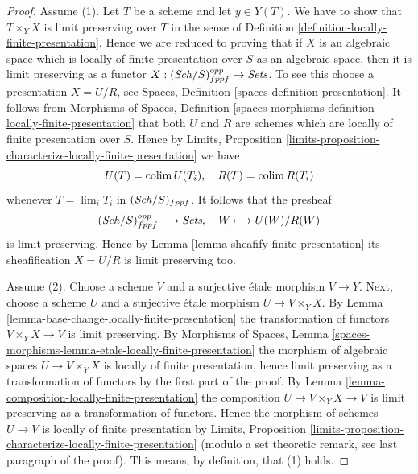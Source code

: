 \begin{proof}
Assume (1). Let $T$ be a scheme and let $y \in Y(T)$. We have to show that
$T \times_Y X$ is limit preserving over $T$ in the sense of
Definition \ref{definition-locally-finite-presentation}.
Hence we are reduced to proving that if $X$ is an algebraic space which
is locally of finite presentation over $S$ as an algebraic space, then it
is limit preserving as a functor
$X : (\mathit{Sch}/S)_{fppf}^{opp} \to \textit{Sets}$.
To see this choose a presentation $X = U/R$, see
Spaces, Definition \ref{spaces-definition-presentation}.
It follows from
Morphisms of Spaces,
Definition \ref{spaces-morphisms-definition-locally-finite-presentation}
that both $U$ and $R$ are schemes which are locally of finite presentation
over $S$. Hence by
Limits, Proposition
\ref{limits-proposition-characterize-locally-finite-presentation}
we have
$$
U(T) = \mathop{\mathrm{colim}}\nolimits U(T_i), \quad
R(T) = \mathop{\mathrm{colim}}\nolimits R(T_i)
$$
whenever $T = \lim_i T_i$ in $(\mathit{Sch}/S)_{fppf}$. It follows
that the presheaf
$$
(\mathit{Sch}/S)_{fppf}^{opp} \longrightarrow \textit{Sets}, \quad
W \longmapsto U(W)/R(W)
$$
is limit preserving. Hence by
Lemma \ref{lemma-sheafify-finite-presentation}
its sheafification $X = U/R$ is limit preserving too.

\medskip\noindent
Assume (2). Choose a scheme $V$ and a surjective \'etale morphism
$V \to Y$. Next, choose a scheme $U$ and a surjective \'etale morphism
$U \to V \times_Y X$. By
Lemma \ref{lemma-base-change-locally-finite-presentation}
the transformation of functors $V \times_Y X \to V$ is limit preserving. By
Morphisms of Spaces,
Lemma \ref{spaces-morphisms-lemma-etale-locally-finite-presentation}
the morphism of algebraic spaces $U \to V \times_Y X$ is locally
of finite presentation, hence limit preserving as
a transformation of functors by the first part of the proof. By
Lemma \ref{lemma-composition-locally-finite-presentation}
the composition $U \to V \times_Y X \to V$ is limit preserving
as a transformation of functors. Hence
the morphism of schemes $U \to V$ is locally of finite presentation by
Limits, Proposition
\ref{limits-proposition-characterize-locally-finite-presentation}
(modulo a set theoretic remark, see last paragraph of the proof).
This means, by definition, that (1) holds.


\end{proof}

